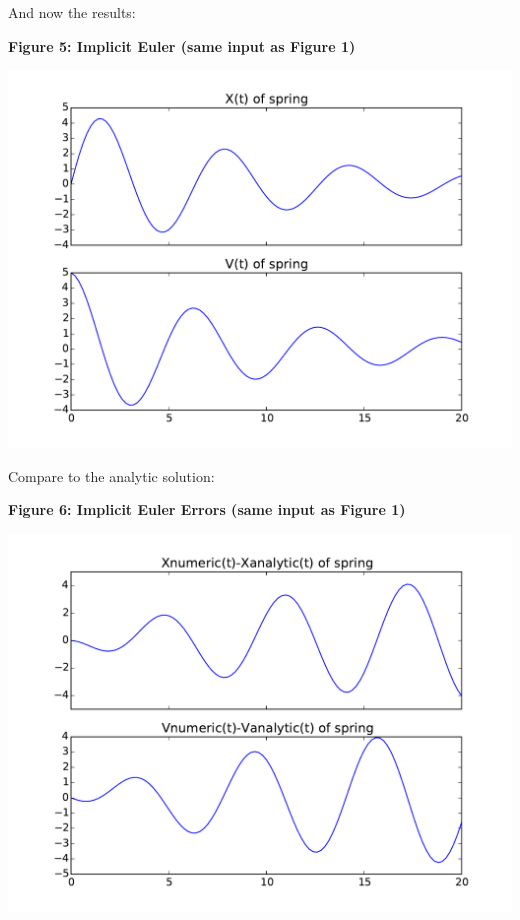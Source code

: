 \documentclass{article}
\begin{document}
And now the results:

\begin{minipage}{1.0\textwidth}
\begin{center}
    \textbf{Figure 5: Implicit Euler (same input as Figure 1)}\par\medskip
    \includegraphics[scale=1.0]{implicitEuler1}
\end{center}
\end{minipage}

Compare to the analytic solution:

\begin{minipage}{1.0\textwidth}
\begin{center}
    \textbf{Figure 6: Implicit Euler Errors (same input as Figure 1)}\par\medskip
    \includegraphics[scale=1.0]{implicitEulerErrors1}
\end{center}
\end{minipage}
\end{document}
